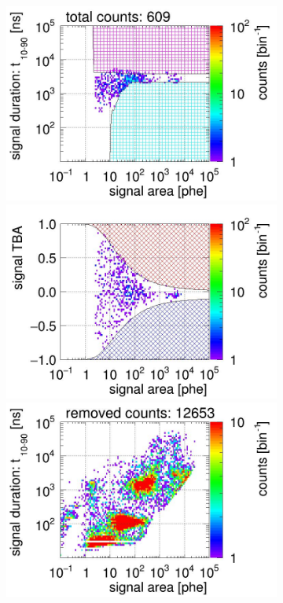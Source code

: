 \begin{landscape}
\begin{figure}[!p]
\begin{subfigure}[t]{0.32\textwidth}
			\includegraphics[width=\figurewidth,clip,trim={0 98 0 15}]{Figures/GasTest/CutsValid/res64765/pdpa23Vecfig64765.jpg}
			\includegraphics[width=\figurewidth,clip,trim={0 98 0 40}]{Figures/GasTest/CutsValid/res64765/tbapa23Vecfig64765.jpg}
			\includegraphics[width=\figurewidth,clip,trim={0 98 0 15}]{Figures/GasTest/CutsValid/res64765/pdpaX23Vecfig64765.jpg}

\end{subfigure}
\end{figure}
\end{landscape}
